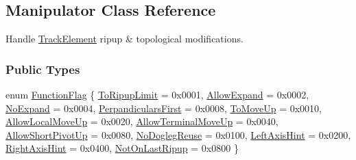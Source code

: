 \hypertarget{classKite_1_1Manipulator}{}\subsection{Manipulator Class Reference}
\label{classKite_1_1Manipulator}


Handle \hyperlink{classKite_1_1TrackElement}{Track\+Element} ripup \& topological modifications.  


\subsubsection*{Public Types}
\begin{DoxyCompactItemize}
\item 
enum \hyperlink{classKite_1_1Manipulator_a2af2ad6b6441614038caf59d04b3b217}{Function\+Flag} \{ \newline
\hyperlink{classKite_1_1Manipulator_a2af2ad6b6441614038caf59d04b3b217a6c00c46010d69247a3edc18b70d700fa}{To\+Ripup\+Limit} = 0x0001, 
\newline
\hyperlink{classKite_1_1Manipulator_a2af2ad6b6441614038caf59d04b3b217a41880b9f6652400677e21c8681f97675}{Allow\+Expand} = 0x0002, 
\newline
\hyperlink{classKite_1_1Manipulator_a2af2ad6b6441614038caf59d04b3b217a6d972ea7eb37fa1b58a9b3b805241ffd}{No\+Expand} = 0x0004, 
\newline
\hyperlink{classKite_1_1Manipulator_a2af2ad6b6441614038caf59d04b3b217acdaeb48fa352f2898aa225b618ca26d4}{Perpandiculars\+First} = 0x0008, 
\newline
\hyperlink{classKite_1_1Manipulator_a2af2ad6b6441614038caf59d04b3b217a6d49b8eaa1014c8d0169a22b2f675b4d}{To\+Move\+Up} = 0x0010, 
\newline
\hyperlink{classKite_1_1Manipulator_a2af2ad6b6441614038caf59d04b3b217a195c742e60b541424ed7b231e9736803}{Allow\+Local\+Move\+Up} = 0x0020, 
\newline
\hyperlink{classKite_1_1Manipulator_a2af2ad6b6441614038caf59d04b3b217ad16eaf385267fc57b0deba7cf2c49244}{Allow\+Terminal\+Move\+Up} = 0x0040, 
\newline
\hyperlink{classKite_1_1Manipulator_a2af2ad6b6441614038caf59d04b3b217a03c3d2cc0e6cfcf5cb2022d70a07f510}{Allow\+Short\+Pivot\+Up} = 0x0080, 
\newline
\hyperlink{classKite_1_1Manipulator_a2af2ad6b6441614038caf59d04b3b217ab254c6d61bbff307a2eb6592e1546131}{No\+Dogleg\+Reuse} = 0x0100, 
\newline
\hyperlink{classKite_1_1Manipulator_a2af2ad6b6441614038caf59d04b3b217ab525fc8ee72323922f991c26e098bd5a}{Left\+Axis\+Hint} = 0x0200, 
\newline
\hyperlink{classKite_1_1Manipulator_a2af2ad6b6441614038caf59d04b3b217a4412082ce8109b740834fe21e7a671fb}{Right\+Axis\+Hint} = 0x0400, 
\newline
\hyperlink{classKite_1_1Manipulator_a2af2ad6b6441614038caf59d04b3b217aeea607aabb515b52c3b29df30b079d21}{Not\+On\+Last\+Ripup} = 0x0800
 \}
\end{DoxyCompactItemize}
